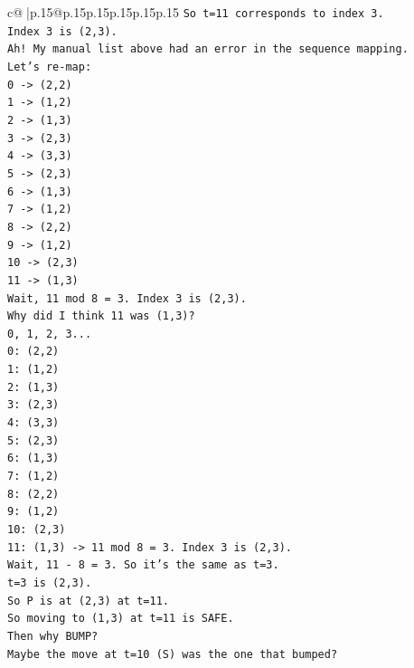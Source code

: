 \documentclass{article}
\begin{document}
{\begin{supertabular}{c@{$\;$}|p{.15\linewidth}@{}p{.15\linewidth}p{.15\linewidth}p{.15\linewidth}p{.15\linewidth}p{.15\linewidth}}
{{{\texttt{So t=11 corresponds to index 3.} \\
\texttt{Index 3 is (2,3).} \\
\texttt{Ah! My manual list above had an error in the sequence mapping.} \\
\texttt{Let's re{-}map:} \\
\texttt{0 {-}> (2,2)} \\
\texttt{1 {-}> (1,2)} \\
\texttt{2 {-}> (1,3)} \\
\texttt{3 {-}> (2,3)} \\
\texttt{4 {-}> (3,3)} \\
\texttt{5 {-}> (2,3)} \\
\texttt{6 {-}> (1,3)} \\
\texttt{7 {-}> (1,2)} \\
\texttt{8 {-}> (2,2)} \\
\texttt{9 {-}> (1,2)} \\
\texttt{10 {-}> (2,3)} \\
\texttt{11 {-}> (1,3)} \\
\texttt{Wait, 11 mod 8 = 3. Index 3 is (2,3).} \\
\texttt{Why did I think 11 was (1,3)?} \\
\texttt{0, 1, 2, 3...} \\
\texttt{0: (2,2)} \\
\texttt{1: (1,2)} \\
\texttt{2: (1,3)} \\
\texttt{3: (2,3)} \\
\texttt{4: (3,3)} \\
\texttt{5: (2,3)} \\
\texttt{6: (1,3)} \\
\texttt{7: (1,2)} \\
\texttt{8: (2,2)} \\
\texttt{9: (1,2)} \\
\texttt{10: (2,3)} \\
\texttt{11: (1,3) {-}> 11 mod 8 = 3. Index 3 is (2,3).} \\
\texttt{Wait, 11 {-} 8 = 3. So it's the same as t=3.} \\
\texttt{t=3 is (2,3).} \\
\texttt{So P is at (2,3) at t=11.} \\
\texttt{So moving to (1,3) at t=11 is SAFE.} \\
\texttt{Then why BUMP?} \\
\texttt{Maybe the move at t=10 (S) was the one that bumped?} \\
}}}
\end{supertabular}}
\end{document}
